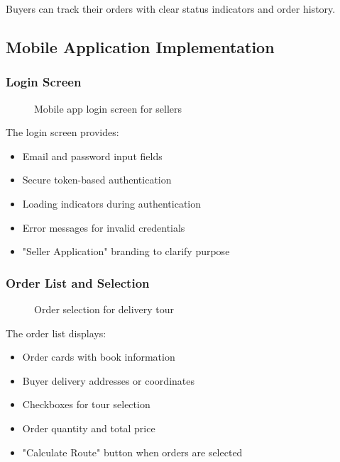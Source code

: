 \documentclass[12pt,a4paper]{article}
\begin{document}
Buyers can track their orders with clear status indicators and order history.

\subsection{Mobile Application Implementation}

\subsubsection{Login Screen}

\begin{figure}[h]
    \centering
    \caption{Mobile app login screen for sellers}
\end{figure}

The login screen provides:
\begin{itemize}
    \item Email and password input fields
    \item Secure token-based authentication
    \item Loading indicators during authentication
    \item Error messages for invalid credentials
    \item "Seller Application" branding to clarify purpose
\end{itemize}

\subsubsection{Order List and Selection}

\begin{figure}[h]
    \centering
    \caption{Order selection for delivery tour}
\end{figure}

The order list displays:
\begin{itemize}
    \item Order cards with book information
    \item Buyer delivery addresses or coordinates
    \item Checkboxes for tour selection
    \item Order quantity and total price
    \item "Calculate Route" button when orders are selected
\end{itemize}
\end{document}

